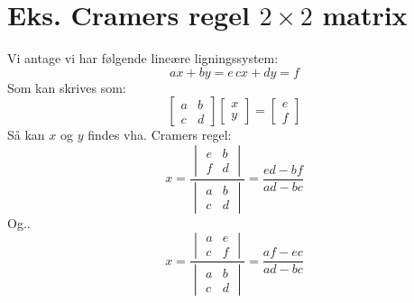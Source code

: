 \documentclass[a4paper,oneside,article]{memoir}
\begin{document}
    \section{Eks. Cramers regel $2 \times 2$ matrix}
    Vi antage vi har følgende lineære ligningssystem:
    $$ax+by=e\,cx+dy=f$$
    Som kan skrives som:
    $$\begin{bmatrix}
    a & b\\
    c & d
    \end{bmatrix}\begin{bmatrix}
    x \\ y
    \end{bmatrix}=\begin{bmatrix}
    e \\ f
    \end{bmatrix}$$
    Så kan $x$ og $y$ findes vha. Cramers regel:
    $$x=\frac{\begin{vmatrix}
    e & b \\
    f & d
    \end{vmatrix}}{
    \begin{vmatrix}
    a & b \\
    c & d
    \end{vmatrix}}= \frac{ed-bf}{ad-bc}$$
    Og..
    $$x=\frac{\begin{vmatrix}
    a & e \\
    c & f
    \end{vmatrix}}{
    \begin{vmatrix}
    a & b \\
    c & d
    \end{vmatrix}}= \frac{af-ec}{ad-bc}$$
\end{document}
